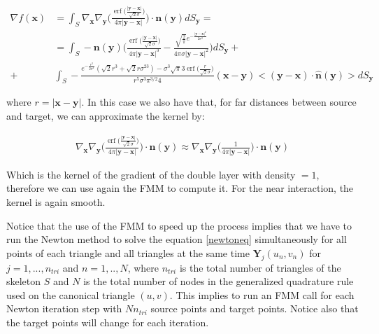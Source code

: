 \documentclass[11pt, oneside]{article}
\DeclareMathOperator\erf{erf}
\newcommand\bx{\boldsymbol x}
\newcommand\by{\boldsymbol y}
\newcommand\bn{\boldsymbol n}
\newcommand\bY{\boldsymbol Y}
\begin{document}
\begin{equation}\label{surf_nablaf}
\begin{aligned}
\nabla f(\bx)&=\int_{\mathit{S}}\nabla_{\bx}\nabla_{\by}\Big(\frac{\erf\big(\frac{|\by-\bx|}{\sqrt{2}\sigma}\big)}{4\pi|\by-\bx|}\Big)\cdot\bn(\by)dS_{\by}=\\
&=\int_{\mathit{S}}-\bn(\by)\Bigg(\frac{\erf\big(\frac{|\by-\bx|}{\sqrt{2}\sigma}\big)}{4\pi|\by-\bx|^3}-\frac{\sqrt{\frac{2}{\pi}}e^{-\frac{|\by-\bx|^2}{2\sigma^2}}}{4\pi\sigma|\by-\bx|^2}\Bigg)dS_{\by}+\\
+&\int_{\mathit{S}} -\frac{e^{-\frac{r^2}{2\sigma^2}}(\sqrt{2}r^3+\sqrt{2}r\sigma^23)-\sigma^3\sqrt{\pi}3\erf{\big(\frac{r}{\sqrt{2}\sigma}}\big)}{r^5\sigma^3\pi^{3/2}4}(\bx-\by)<(\by-\bx)\cdot \hat{\bn}(\by)>dS_{\by}
\end{aligned}
\end{equation}


where $r=|\bx-\by|$. In this case we also have that, for far distances between source and target, we can approximate the kernel by:

\begin{equation}
\begin{aligned}
\nabla_{\bx}\nabla_{\by}\Big(\frac{\erf\big(\frac{|\by-\bx|}{\sqrt{2}\sigma}\big)}{4\pi|\by-\bx|}\Big)\cdot\bn(\by)\approx
\nabla_{\bx}\nabla_{\by}\Big(\frac{1}{4\pi|\by-\bx|}\Big)\cdot\bn(\by)
\end{aligned}
\end{equation}

Which is the kernel of the gradient of the double layer with density $=1$, therefore we can use again the FMM to compute it. For the near interaction, the kernel is again smooth.

Notice that the use of the FMM to speed up the process implies that we have to run the Newton method to solve the equation \ref{newtoneq} simultaneously for all points of each triangle and all triangles at the same time $\bY_j(u_n,v_n)$ for $j=1,...,n_{tri}$ and $n=1,..,N$, where $n_{tri}$ is the total number of triangles of the skeleton $\mathit{S}$ and $N$ is the total number of nodes in the generalized quadrature rule used on the canonical triangle $(u,v)$. This implies to run an FMM call for each Newton iteration step with $Nn_{tri}$ source points and target points. Notice also that the target points will change for each iteration.
\end{document}
